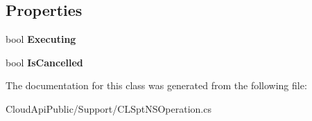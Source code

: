 \subsection*{Properties}
\begin{DoxyCompactItemize}
\item 
\hypertarget{class_cloud_api_public_1_1_support_1_1_c_l_spt_n_s_operation_ab4edd012d98b38a662e1b1f310b42600}{bool {\bfseries Executing}}\label{class_cloud_api_public_1_1_support_1_1_c_l_spt_n_s_operation_ab4edd012d98b38a662e1b1f310b42600}

\item 
\hypertarget{class_cloud_api_public_1_1_support_1_1_c_l_spt_n_s_operation_a070ac00d2f6daf8347bae5bd451e4ddd}{bool {\bfseries Is\-Cancelled}}\label{class_cloud_api_public_1_1_support_1_1_c_l_spt_n_s_operation_a070ac00d2f6daf8347bae5bd451e4ddd}

\end{DoxyCompactItemize}


The documentation for this class was generated from the following file\-:\begin{DoxyCompactItemize}
\item 
Cloud\-Api\-Public/\-Support/C\-L\-Spt\-N\-S\-Operation.\-cs\end{DoxyCompactItemize}
